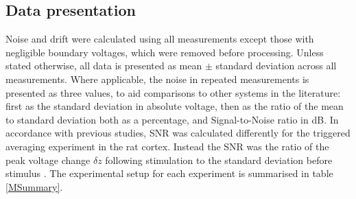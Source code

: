 \subsection{Data presentation}

Noise and drift were calculated using all measurements except those with negligible boundary voltages, which were removed before processing. Unless stated otherwise, all data is presented as mean $\pm$ standard deviation across all measurements. Where applicable, the noise in repeated measurements is presented as three values, to aid comparisons to other systems in the literature: first as the standard deviation in absolute voltage, then as the ratio of the mean to standard deviation both as a percentage, and Signal-to-Noise ratio in dB. In accordance with previous studies, SNR was calculated differently for the triggered averaging experiment in the rat cortex. Instead the SNR was the ratio of the peak voltage change $\delta z$ following stimulation to the standard deviation before stimulus \cite{Oh2011}. The experimental setup for each experiment is summarised in table \ref{MSummary}.
